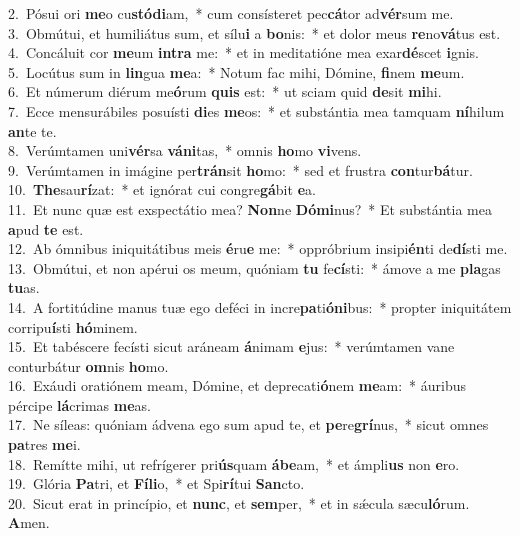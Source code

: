 {2.~}Pósui ori \textbf{me}o cu\textbf{stó}\textbf{di}am,~* cum consísteret pec\textbf{cá}tor ad\textbf{vér}sum me.\\
{3.~}Obmútui, et humiliátus sum, et sílu\textbf{i} a \textbf{bo}nis:~* et dolor meus \textbf{re}no\textbf{vá}tus est.\\
{4.~}Concáluit cor \textbf{me}um \textbf{in}\textbf{tra} me:~* et in meditatióne mea exar\textbf{dé}scet \textbf{i}gnis.\\
{5.~}Locútus sum in \textbf{lin}gua \textbf{me}a:~* Notum fac mihi, Dómine, \textbf{fi}nem \textbf{me}um.\\
{6.~}Et númerum diérum me\textbf{ó}rum \textbf{quis} est:~* ut sciam quid \textbf{de}sit \textbf{mi}hi.\\
{7.~}Ecce mensurábiles posuísti \textbf{di}es \textbf{me}os:~* et substántia mea tamquam \textbf{ní}hilum \textbf{an}te te.\\
{8.~}Verúmtamen uni\textbf{vér}sa \textbf{vá}\textbf{ni}tas,~* omnis \textbf{ho}mo \textbf{vi}vens.\\
{9.~}Verúmtamen in imágine per\textbf{trán}sit \textbf{ho}mo:~* sed et frustra \textbf{con}tur\textbf{bá}tur.\\
{10.~}\textbf{The}sau\textbf{rí}zat:~* et ignórat cui congre\textbf{gá}bit \textbf{e}a.\\
{11.~}Et nunc quæ est exspectátio mea? \textbf{Non}ne \textbf{Dó}\textbf{mi}nus?~* Et substántia mea \textbf{a}pud \textbf{te} est.\\
{12.~}Ab ómnibus iniquitátibus meis \textbf{é}ru\textbf{e} me:~* oppróbrium insipi\textbf{én}ti de\textbf{dí}sti me.\\
{13.~}Obmútui, et non apérui os meum, quóniam \textbf{tu} fe\textbf{cí}sti:~* ámove a me \textbf{pla}gas \textbf{tu}as.\\
{14.~}A fortitúdine manus tuæ ego deféci in incre\textbf{pa}ti\textbf{ó}\textbf{ni}bus:~* propter iniquitátem corripu\textbf{í}sti \textbf{hó}minem.\\
{15.~}Et tabéscere fecísti sicut aráneam \textbf{á}nimam \textbf{e}jus:~* verúmtamen vane conturbátur \textbf{om}nis \textbf{ho}mo.\\
{16.~}Exáudi oratiónem meam, Dómine, et deprecati\textbf{ó}nem \textbf{me}am:~* áuribus pércipe \textbf{lá}crimas \textbf{me}as.\\
{17.~}Ne síleas: quóniam ádvena ego sum apud te, et \textbf{pe}re\textbf{grí}nus,~* sicut omnes \textbf{pa}tres \textbf{me}i.\\
{18.~}Remítte mihi, ut refrígerer pri\textbf{ús}quam \textbf{á}\textbf{be}am,~* et ámpli\textbf{us} non \textbf{e}ro.\\
{19.~}Glória \textbf{Pa}tri, et \textbf{Fí}\textbf{li}o,~* et Spi\textbf{rí}tui \textbf{San}cto.\\
{20.~}Sicut erat in princípio, et \textbf{nunc}, et \textbf{sem}per,~* et in sǽcula sæcu\textbf{ló}rum. \textbf{A}men.\\
